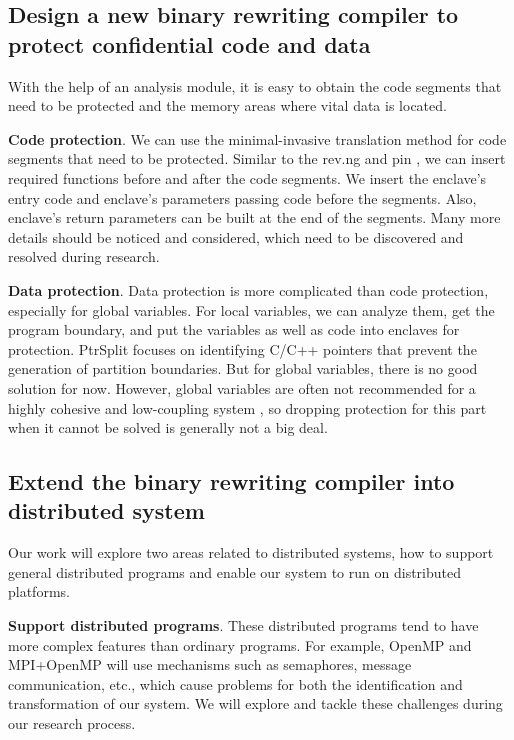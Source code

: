 \subsection{Design a new binary rewriting compiler to protect confidential code and data}
\label{sec:ToolToRewrite}
With the help of an analysis module, it is easy to obtain the code segments that need
to be protected and the memory areas where vital data is located.

\textbf{Code protection}. We can use the minimal-invasive translation method for
code segments that need to be protected. Similar to the rev.ng \cite{Federico2017revngAU}
and pin \cite{Luk2005PinBC}, we can insert required functions before and
after the code segments. We insert the enclave's entry code and enclave's parameters passing code
before the segments. Also, enclave's return parameters can be built at the end of the segments.
Many more details should be noticed and considered, which need to be
discovered and resolved during research.

\textbf{Data protection}. Data protection is more complicated than code protection,
especially for global variables.
For local variables, we can analyze them, get the program boundary,
and put the variables as well as code into enclaves for protection.
PtrSplit \cite{Liu2017PtrSplitSG} focuses on identifying C/C++ pointers
that prevent the generation of partition boundaries.
But for global variables, there is no good solution for now. However,
global variables are often not recommended for a highly cohesive and low-coupling system
\cite{GlobalVariablesAreBad, GlobalVariablesAreEvil},
so dropping protection for this part when it cannot be solved is generally not a big deal.

\subsection{Extend the binary rewriting compiler into distributed system}
\label{sec:ToolToDistributedSystem}
Our work will explore two areas related to distributed systems, how to support general distributed
programs and enable our system to run on distributed platforms.

\textbf{Support distributed programs}.
These distributed programs tend to have more complex features than ordinary programs.
For example, OpenMP \cite{Dagum1998OpenMPAI} and MPI+OpenMP \cite{Klinkenberg2020CHAMELEONRL}
will use mechanisms such as semaphores, message communication, etc., which cause problems
for both the identification and transformation of our system.
We will explore and tackle these challenges during our research process.


